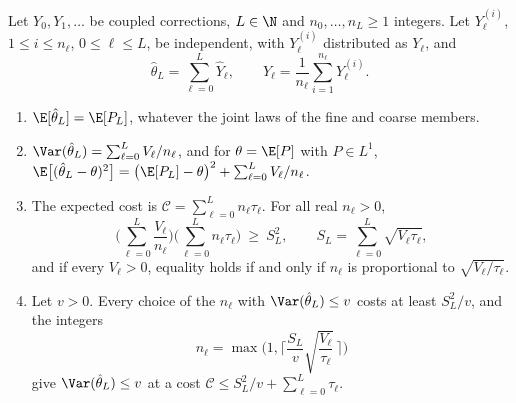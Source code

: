 \begin{proposition}\label{prop:ml-telescoping}
Let $Y_0,Y_1,\dots$ be coupled corrections, $L\in\N$ and $n_0,\dots,n_L\ge1$ integers. Let
$Y^{(i)}_\ell$, $1\le i\le n_\ell$, $0\le\ell\le L$, be independent, with $Y^{(i)}_\ell$
distributed as $Y_\ell$, and
\begin{equation}\label{eq:ml-estimator}
  \hat\theta_L=\sum_{\ell=0}^L\hat Y_\ell,\qquad \hat Y_\ell=\frac1{n_\ell}\sum_{i=1}^{n_\ell}Y^{(i)}_\ell .
\end{equation}
\begin{enumerate}[label=(\roman*)]
  \item $\E[\hat\theta_L]=\E[P_L]$, whatever the joint laws of the fine and coarse members.
  \item $\Var(\hat\theta_L)=\sum_{\ell=0}^LV_\ell/n_\ell$, and for $\theta=\E[P]$ with
    $P\in L^1$,
    $\E\big[(\hat\theta_L-\theta)^2\big]=\big(\E[P_L]-\theta\big)^2+\sum_{\ell=0}^LV_\ell/n_\ell$.
  \item The expected cost is $\mathcal C=\sum_{\ell=0}^Ln_\ell\tau_\ell$. For all real
    $n_\ell>0$,
    \[
      \Big(\sum_{\ell=0}^L\frac{V_\ell}{n_\ell}\Big)\Big(\sum_{\ell=0}^Ln_\ell\tau_\ell\Big)\ \ge\ S_L^2,
      \qquad S_L=\sum_{\ell=0}^L\sqrt{V_\ell\tau_\ell},
    \]
    and if every $V_\ell>0$, equality holds if and only if $n_\ell$ is proportional to
    $\sqrt{V_\ell/\tau_\ell}$.
  \item Let $v>0$. Every choice of the $n_\ell$ with $\Var(\hat\theta_L)\le v$ costs at least
    $S_L^2/v$, and the integers
    \begin{equation}\label{eq:ml-nl}
      n_\ell=\max\Big(1,\Big\lceil\frac{S_L}{v}\sqrt{\frac{V_\ell}{\tau_\ell}}\,\Big\rceil\Big)
    \end{equation}
    give $\Var(\hat\theta_L)\le v$ at a cost $\mathcal C\le S_L^2/v+\sum_{\ell=0}^L\tau_\ell$.
\end{enumerate}
\end{proposition}

